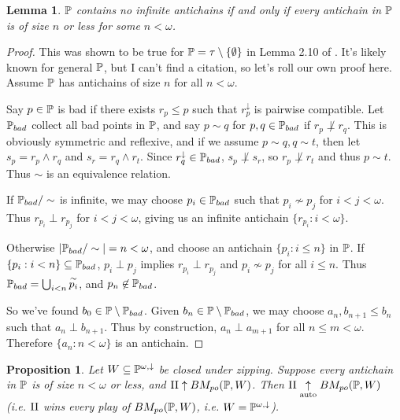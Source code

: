 \documentclass[11pt]{article}
\theoremstyle{plain}
\newtheorem{lemma}[theorem]{Lemma}
\newtheorem{proposition}[theorem]{Proposition}
\theoremstyle{definition}
\theoremstyle{remark}
\theoremstyle{plain}
\theoremstyle{definition}
\theoremstyle{remark}
\newcommand{\bmPoGame}[2]{BM_{po}(#1,#2)}
\begin{document}
  \begin{lemma}
    \(\mathbb{P}\) contains no infinite antichains if and only if every
    antichain in \(\mathbb{P}\) is of size \(n\) or less for some \(n<\omega\).
  \end{lemma}

  \begin{proof}
    This was shown to be true for \(\mathbb{P}=\tau\setminus\{\emptyset\}\) in
    Lemma 2.10 of \cite{comfort_negrepontis_1982}. It's likely known
    for general \(\mathbb{P}\), but I can't find a citation, so let's roll
    our own proof here. Assume \(\mathbb{P}\) has antichains of size \(n\)
    for all \(n<\omega\).

    Say \(p\in\mathbb{P}\) is bad if there exists \(r_p\leq p\) such that
    \(r_p^\downarrow\) is pairwise compatible. Let
    \(\mathbb{P}_{bad}\) collect all bad points in \(\mathbb{P}\), and say
    \(p\sim q\) for \(p,q\in\mathbb{P}_{bad}\) if \(r_p\not\perp r_q\).
    This is obviously symmetric and reflexive, and if we assume
    \(p\sim q,q\sim t\), then let \(s_p=r_p\wedge r_q\) and
    \(s_r=r_q\wedge r_t\). Since \(r_q^\downarrow\in\mathbb{P}_{bad}\),
    \(s_p\not\perp s_r\), so \(r_p\not\perp r_t\) and thus
    \(p\sim t\). Thus \(\sim\) is an equivalence relation.

    If \(\mathbb{P}_{bad}/\sim\) is infinite, we may choose \(p_i\in\mathbb{P}_{bad}\)
    such that \(p_i\not\sim p_j\) for \(i<j<\omega\). Thus
    \(r_{p_i}\perp r_{p_j}\) for \(i<j<\omega\), giving us
    an infinite antichain \(\{r_{p_i}:i<\omega\}\).

    Otherwise \(|\mathbb{P}_{bad}/\sim|=n<\omega\), and choose an antichain
    \(\{p_i:i\leq n\}\) in \(\mathbb{P}\). If \(\{p_i:i<n\}\subseteq\mathbb{P}_{bad}\),
    \(p_i\perp p_j\) implies \(r_{p_i}\perp r_{p_j}\)
    and \(p_i\not\sim p_j\) for all
    \(i\leq n\). Thus \(\mathbb{P}_{bad}=\bigcup_{i<n}\overset{\sim}{p_i}\),
    and \(p_n\not\in\mathbb{P}_{bad}\).

    So we've found \(b_0\in\mathbb{P}\setminus\mathbb{P}_{bad}\).
    Given \(b_n\in\mathbb{P}\setminus\mathbb{P}_{bad}\), we may choose
    \(a_n,b_{n+1}\leq b_n\) such that \(a_n\perp b_{n+1}\).
    Thus by construction, \(a_n\perp a_{m+1}\) for all
    \(n\leq m<\omega\). Therefore
    \(\{a_n:n<\omega\}\) is an antichain.
  \end{proof}

  \begin{proposition}
    Let \(W\subseteq\mathbb{P}^{\omega,\downarrow}\) be closed under zipping.
    Suppose every antichain in \(\mathbb{P}\) is of size \(n<\omega\) or less,
    and \(\plII\win\bmPoGame{\mb P}{W}\). Then
    \(\plII\autowin\bmPoGame{\mb P}{W}\) (i.e. \(\mathrm{II}\) wins every
    play of \(\bmPoGame{\mb P}{W}\), i.e. \(W=\mathbb{P}^{\omega,\downarrow}\)).
  \end{proposition}
\end{document}

